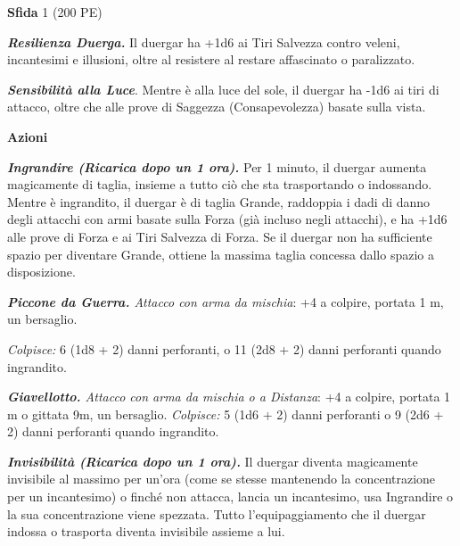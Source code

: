 \begin{multicols}{2}
\textbf{Sfida} 1 (200 PE)

\emph{\textbf{Resilienza Duerga.}} Il duergar ha +1d6 ai Tiri Salvezza contro veleni, incantesimi e illusioni, oltre al resistere al restare affascinato o paralizzato.

\emph{\textbf{Sensibilità alla Luce}}. Mentre è alla luce del sole, il duergar ha -1d6 ai tiri di attacco, oltre che alle prove di Saggezza (Consapevolezza) basate sulla vista.

\textbf{Azioni}

\emph{\textbf{Ingrandire (Ricarica dopo un 1 ora).}} Per 1 minuto, il duergar aumenta magicamente di taglia, insieme a tutto ciò che sta trasportando o indossando. Mentre è ingrandito, il duergar è di taglia Grande, raddoppia i dadi di danno degli attacchi con armi basate sulla Forza (già incluso negli attacchi), e ha +1d6 alle prove di Forza e ai Tiri Salvezza di Forza. Se il duergar non ha sufficiente spazio per diventare Grande, ottiene la massima taglia concessa dallo spazio a disposizione.

\emph{\textbf{Piccone da Guerra.} Attacco con arma da mischia}: +4 a colpire, portata 1 m, un bersaglio.

\emph{Colpisce:} 6 (1d8 + 2) danni perforanti, o 11 (2d8 + 2) danni perforanti quando ingrandito.

\emph{\textbf{Giavellotto.} Attacco con arma da mischia o a Distanza}: +4 a colpire, portata 1 m o gittata 9m, un bersaglio. \emph{Colpisce:} 5 (1d6 + 2) danni perforanti o 9 (2d6 + 2) danni
perforanti quando ingrandito.

\emph{\textbf{Invisibilità (Ricarica dopo un 1 ora).}} Il duergar diventa magicamente invisibile al massimo per un'ora (come se stesse mantenendo la concentrazione per un incantesimo) o finché non attacca, lancia un incantesimo, usa Ingrandire o la sua concentrazione viene spezzata. Tutto l'equipaggiamento che il duergar indossa o trasporta diventa invisibile assieme a lui.


\end{multicols}
